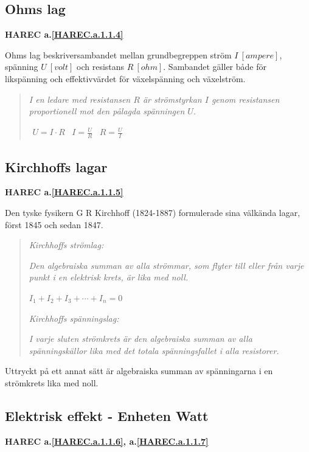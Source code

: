 \subsection{Ohms lag}
\textbf{HAREC a.\ref{HAREC.a.1.1.4}\label{myHAREC.a.1.1.4}}

Ohms lag beskriversambandet mellan grundbegreppen ström \(I\ [ampere]\),
spänning \(U\ [volt]\) och resistans \(R\ [ohm]\).
Sambandet gäller både för likspänning och effektivvärdet för växelspänning och
växelström.

\begin{quote}
\emph{I en ledare med resistansen \(R\) är strömstyrkan \(I\) genom resistansen
proportionell mot den pålagda spänningen \(U\).}

\(\begin{array}{ccc}U=I \cdot R & I=\frac{U}{R} & R=\frac{U}{I}\end{array}\)
\end{quote}

\subsection{Kirchhoffs lagar}
\textbf{HAREC a.\ref{HAREC.a.1.1.5}\label{myHAREC.a.1.1.5}}

Den tyske fysikern G R Kirchhoff (1824-1887) formulerade sina välkända lagar,
först 1845 och sedan 1847.

\begin{quote}
\emph{Kirchhoffs strömlag:}

\emph{Den algebraiska summan av alla strömmar, som flyter till eller från varje punkt
i en elektrisk krets, är lika med noll.}

\(I_1 + I_2 + I_3 + \cdots + I_n = 0\)

\emph{Kirchhoffs spänningslag:}

\emph{I varje sluten strömkrets är den algebraiska summan av alla spänningskällor lika
med det totala spänningsfallet i alla resistorer.}
\end{quote}

Uttryckt på ett annat sätt är algebraiska summan av spänningarna i en
strömkrets lika med noll.

\subsection{Elektrisk effekt - Enheten Watt}
\textbf{HAREC a.\ref{HAREC.a.1.1.6}\label{myHAREC.a.1.1.6}, a.\ref{HAREC.a.1.1.7}\label{myHAREC.a.1.1.7}}

